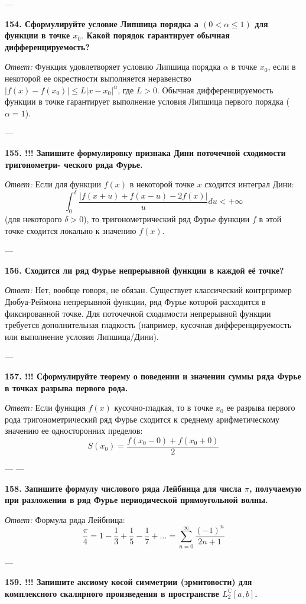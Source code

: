 \documentclass{article}
\begin{document}
---

\textbf{154. Сформулируйте условие Липшица порядка а $(0<\alpha\le1)$ для функции в точке $x_{0}.$ Какой порядок гарантирует обычная дифференцируемость?}

\textit{Ответ:} Функция удовлетворяет условию Липшица порядка $\alpha$ в точке $x_0$, если в некоторой ее окрестности выполняется неравенство $|f(x) - f(x_0)| \le L |x - x_0|^\alpha$, где $L > 0$. Обычная дифференцируемость функции в точке гарантирует выполнение условия Липшица первого порядка ($\alpha = 1$).

---

\textbf{155. !!! Запишите формулировку признака Дини поточечной сходимости тригонометри- ческого ряда Фурье.}

\textit{Ответ:} Если для функции $f(x)$ в некоторой точке $x$ сходится интеграл Дини:
$$ \int_0^\delta \frac{|f(x+u) + f(x-u) - 2f(x)|}{u} du < +\infty $$
(для некоторого $\delta > 0$), то тригонометрический ряд Фурье функции $f$ в этой точке сходится локально к значению $f(x)$.

---

\textbf{156. Сходится ли ряд Фурье непрерывной функции в каждой её точке?}

\textit{Ответ:} Нет, вообще говоря, не обязан. Существует классический контрпример Дюбуа-Реймона непрерывной функции, ряд Фурье которой расходится в фиксированной точке. Для поточечной сходимости непрерывной функции требуется дополнительная гладкость (например, кусочная дифференцируемость или выполнение условия Липшица/Дини).

---

\textbf{157. !!! Сформулируйте теорему о поведении и значении суммы ряда Фурье в точках разрыва первого рода.}

\textit{Ответ:} Если функция $f(x)$ кусочно-гладкая, то в точке $x_0$ ее разрыва первого рода тригонометрический ряд Фурье сходится к среднему арифметическому значению ее односторонних пределов:
$$ S(x_0) = \frac{f(x_0 - 0) + f(x_0 + 0)}{2} $$

---
---

\textbf{158. Запишите формулу числового ряда Лейбница для числа $\pi$, получаемую при разложении в ряд Фурье периодической прямоугольной волны.}

\textit{Ответ:} Формула ряда Лейбница:
$$ \frac{\pi}{4} = 1 - \frac{1}{3} + \frac{1}{5} - \frac{1}{7} + \dots = \sum_{n=0}^{\infty} \frac{(-1)^n}{2n+1} $$

---

\textbf{159. !!! Запишите аксиому косой симметрии (эрмитовости) для комплексного скалярного произведения в пространстве $L_{2}^{\mathbb{C}}[a,b]$.}
\end{document}
